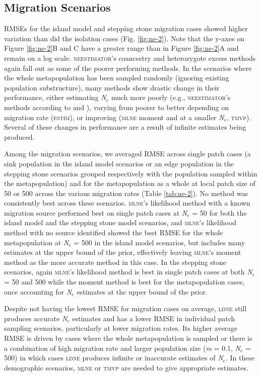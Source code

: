 \subsection{Migration Scenarios}
RMSEs for the island model and stepping stone migration cases showed higher variation than did 
the isolation cases (Fig. \ref{fig:ne-2}). Note that the y-axes on Figure \ref{fig:ne-2}B and C have a greater range than 
in Figure \ref{fig:ne-2}A and remain on a log scale. \textsc{neestimator}'s coancestry and heterozygote excess 
methods again fall out as some of the poorer performing methods. In the scenarios where the whole 
metapopulation has been sampled randomly (ignoring existing population substructure), many methods 
show drastic change in their performance, either estimating \emph{N}$_e$ much more poorly (e.g., 
\textsc{neestimator}'s methods according to \citet{Pollak:1983} and \citet{Nei:1981}), varying from 
poorer to better depending on migration rate (\textsc{estim}), or improving (\textsc{mlne} moment and at a 
smaller \emph{N}$_e$, \textsc{tmvp}). Several of these changes in performance are a result of 
infinite estimates being produced.

Among the migration scenarios, we averaged RMSE across single patch cases (a sink population in 
the island model scenarios or an edge population in the stepping stone scenarios grouped respectively 
with the population sampled within the metapopulation) and for the metapopulation as a whole at local 
patch size of 50 or 500 across the various migration rates (Table \ref{tab:ne-2}). No method was consistently 
best across these scenarios. \textsc{mlne}'s likelihood method with a known migration source performed 
best on single patch cases at \emph{N}$_e$ = 50 for both the island model and the
stepping stone model scenarios, and \textsc{mlne}'s likelihood method with no source identified 
showed the best RMSE for the whole metapopulation at \emph{N}$_e$ = 500 in the island model 
scenarios, but includes many estimates at the upper bound of the prior, effectively leaving 
\textsc{mlne}'s moment method as the more accurate method in this case. In the stepping stone scenarios, 
again \textsc{mlne}'s likelihood method is best in single patch cases at both \emph{N}$_e$ = 50 and 500 
while the moment method is best for the metapopulation cases, once accounting for \emph{N}$_e$ estimates 
at the upper bound of the prior.

Despite not having the lowest RMSE for migration cases on average, \textsc{ldne} still produces 
accurate \emph{N}$_e$ estimates and has a lower RMSE in individual patch sampling scenarios, particularly 
at lower migration rates. Its higher average RMSE is driven by cases where the whole metapopulation is 
sampled or there is a combination of high migration rate and larger population size (\emph{m} = 0.1, \emph{N}$_e$ = 500) 
in which cases \textsc{ldne} produces infinite or inaccurate estimates of \emph{N}$_e$. In these demographic 
scenarios, \textsc{mlne} or \textsc{tmvp} are needed to give appropriate estimates.

